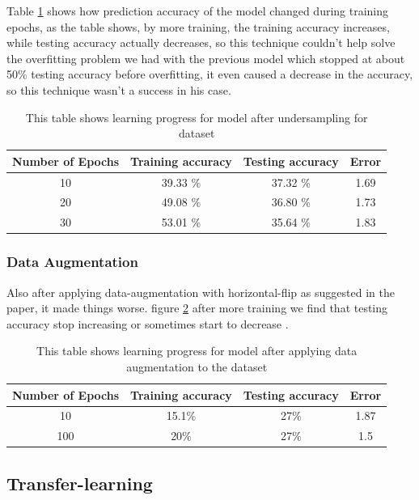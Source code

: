 Table \ref{tab:table1} shows how prediction accuracy of the model changed during training epochs, as the table shows, by more training, the training accuracy increases, while testing accuracy actually decreases, so this technique couldn't help solve the overfitting problem we had with the previous model which stopped at about 50\% testing accuracy before overfitting, it even caused a decrease in the accuracy, so this technique wasn't a success in his case. 
\begin{table}[h!]
	\centering
	\caption{This table shows learning progress for model after undersampling for dataset}
	\label{tab:table1}
	\begin{tabular}{c | c | c | c}
		\textbf{Number of Epochs} & \textbf{Training accuracy} & \textbf{Testing accuracy} & \textbf{Error}\\ \hline 
		10 & 39.33 \% & 37.32 \% & 1.69 \\
		20 & 49.08 \% & 36.80 \% & 1.73 \\
		30 & 53.01 \% & 35.64 \% & 1.83 \\
	\end{tabular}
\end{table}

\subsubsection{Data Augmentation}
Also after applying data-augmentation with horizontal-flip as suggested in the paper\cite{state_of_art}, it made things worse.\newline
figure \ref{tab:table12} after more training we find that testing accuracy stop increasing or sometimes start to decrease .
\begin{table}[h!]
	\centering
	\caption{This table shows learning progress for model after applying data augmentation to the dataset}
	\label{tab:table12}
	\begin{tabular}{c | c | c | c}
		\textbf{Number of Epochs} & \textbf{Training accuracy} & \textbf{Testing accuracy} & \textbf{Error}\\ \hline 
		10 & 15.1\% & 27\% & 1.87 \\
		100 & 20\% &  27\% & 1.5 \\
	\end{tabular}
\end{table}

\subsection{Transfer-learning}
